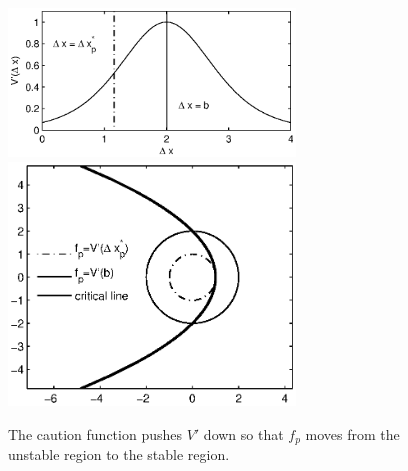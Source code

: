\documentclass[10pt,twocolumn]{article}
\begin{document}
\begin{figure}[!h]
\begin{center}
\includegraphics[width=3in]{vopt_caution}
\includegraphics[width=3in]{ctrstbl}
\end{center}
\caption{ \label{fig:ctrstbl} The caution function pushes $V'$ down so that $f_p$ moves from the unstable region to the stable region.}
\end{figure}
\end{document}

